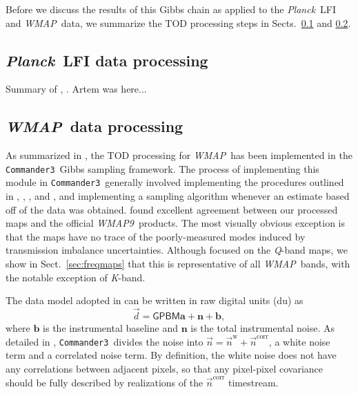 \documentclass[twocolumn]{../../common/aa}
\def\WMAP{\emph{WMAP}}
\def\WMAPnine{\emph{WMAP9}}
\def\wmap{\emph{WMAP}}
\def\planck{\emph{Planck}}
\def\Planck{\emph{Planck}}
\def\commanderthree{\texttt{Commander3}}
\renewcommand{\d}[0]{\vec{d}}
\newcommand{\n}[0]{\vec{n}}
\newcommand{\K}[0]{\textit K}
\newcommand{\Q}[0]{\textit Q}
\begin{document}
Before we discuss the results of this Gibbs chain as applied to the \Planck\ LFI and \WMAP\ data, we summarize the TOD processing steps in Sects.~\ref{ssec:lfi} and \ref{ssec:wmap}.



\subsection{\planck\ LFI data processing}
\label{ssec:lfi}

Summary of \citet{bp01}, \citet{bp10}.
Artem was here...

\subsection{\wmap\ data processing}
\label{ssec:wmap}

As summarized in \citet{bp17}, the TOD processing for \WMAP\ has been
implemented in the \commanderthree\ Gibbs sampling framework.  The process of
implementing this module in \commanderthree\ generally involved implementing
the procedures outlined in \citet{jarosik2003a}, \citet{hinshaw2003a},
\citet{jarosik2007}, and \citet{wmapexsupp}, and implementing a sampling
algorithm whenever an estimate based off of the data was obtained. \citet{bp17}
found excellent agreement between our processed maps and the official
\WMAPnine\ products. The most visually obvious exception is that the
\citet{bp17} maps have no trace of the poorly-measured modes induced by
transmission imbalance uncertainties. Although \citet{bp17} focused on the
\Q-band maps, we show in Sect.~\ref{sec:freqmaps} that this is representative
of all \WMAP\ bands, with the notable exception of \K-band.

The data model adopted in \citet{hinshaw2003a} can be written in raw digital units (du) as
\begin{equation}
	\d = \mathsf{GPBM}\boldsymbol a+\boldsymbol n+\boldsymbol b,
\end{equation}
where $\boldsymbol b$ is the instrumental baseline and $\boldsymbol n$ is the total instrumental noise. As detailed in \citet{bp06}, \commanderthree\ divides the noise into $\n=\n^\mathrm w+\n^\mathrm{corr}$, a white noise term and a correlated noise term. By definition, the white noise does not have any correlations between adjacent pixels, so that any pixel-pixel covariance should be fully described by realizations of the $\n^\mathrm{corr}$ timestream.
\end{document}
